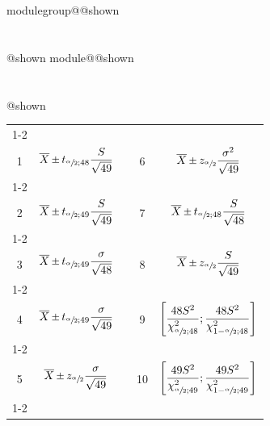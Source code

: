 \documentclass{Evaluation}
\makeatletter
\newcommand{\currentmodulekey}{}
\newcommand{\currentmoduletitle}{}
\newcommand{\currentgroupkey}{}
\newcommand{\currentgrouptitle}{}
\newcommand{\showmoduleifneeded}{%
  \ifx\currentgroupkey\empty\else
    \expandafter\ifx\csname modulegroup@\currentgroupkey @shown\endcsname\relax
      \section*{\currentgrouptitle}%
      \expandafter\gdef\csname modulegroup@\currentgroupkey @shown\endcsname{1}%
    \fi
  \fi
  \expandafter\ifx\csname module@\currentmodulekey @shown\endcsname\relax
    \section*{\currentmoduletitle}%
    \expandafter\gdef\csname module@\currentmodulekey @shown\endcsname{1}%
  \fi
}
\newenvironment{A25}{\showmoduleifneeded}{}
\makeatother
\begin{document}
\begin{questions}
\begin{A25}
\begin{center}
\begin{tabular}{|c|c|c|c|c|}
	\cline{1-2}\cline{4-5}
	&&&&\\[-3mm]
	1 &  $\displaystyle \overline {X}\Mypm t_{\sfrac{\alpha}{2};48}\frac{S}{\sqrt{49}}$
	 & \hspace{0.3cm} &
	 6 &  $\displaystyle \overline {X}\Mypm z_{\sfrac{\alpha}{2}}\frac{\sigma^2}{\sqrt{49}}$
	\\[4mm]
	\cline{1-2}\cline{4-5}
	&&&&\\[-3mm]
	 2 & $\displaystyle \overline {X}\Mypm t_{\sfrac{\alpha}{2};49}\frac{S}{\sqrt{49}}$
	&  &
	 7 & $\displaystyle \overline {X}\Mypm t_{\sfrac{\alpha}{2};48}\frac{S}{\sqrt{48}}$ 
	\\[4mm]
	\cline{1-2}\cline{4-5}
	&&&&\\[-3mm]
	 3 & $\displaystyle \overline {X}\Mypm t_{\sfrac{\alpha}{2};49}\frac{\sigma}{\sqrt{48}}$
	 &  &
	  8 & $\displaystyle \overline {X}\Mypm z_{\sfrac{\alpha}{2}}\frac{S}{\sqrt{49}}$
	 \\[4mm]
	 \cline{1-2}\cline{4-5}
	 &&&&\\[-3mm]
	   4 & $\displaystyle \overline {X}\Mypm t_{\sfrac{\alpha}{2};49}\frac{\sigma}{\sqrt{49}}$
	 &  &
	  9 & $\displaystyle \left[\frac{48S^2}{\chi_{\sfrac{\alpha}{2};48}^2};\frac{48S^2}{\chi_{1-\sfrac{\alpha}{2};48}^2}\right]$
	 \\[5mm]
	 \cline{1-2}\cline{4-5}
	 &&&&\\[-3mm]
	  5 & $\displaystyle \overline {X}\Mypm z_{\sfrac{\alpha}{2}}\frac{\sigma}{\sqrt{49}}$
	 &  &
	  10 & $\displaystyle \left[\frac{49S^2}{\chi_{\sfrac{\alpha}{2};49}^2};\frac{49S^2}{\chi_{1-\sfrac{\alpha}{2};49}^2}\right]$
	 \\[5mm]
	 \cline{1-2}\cline{4-5}

	
\end{tabular}

\end{center}


\end{A25}
\end{questions}
\end{document}
